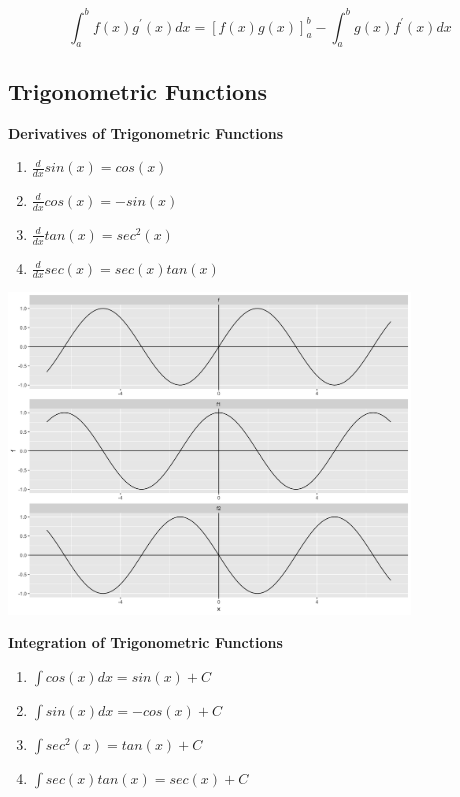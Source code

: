 \documentclass[]{book}
\providecommand{\tightlist}{%
  \setlength{\itemsep}{0pt}\setlength{\parskip}{0pt}}
\begin{document}
\newpage

\[\int_a^b f(x) g^\prime(x)dx=\left [ f(x)g(x) \right ]_a^b-\int_a^b  g(x)f^\prime(x)dx\]

\hypertarget{trigonometric-functions}{%
\subsection{Trigonometric Functions}\label{trigonometric-functions}}

\textbf{Derivatives of Trigonometric Functions}

\begin{enumerate}
\def\labelenumi{\arabic{enumi}.}
\tightlist
\item
  \(\frac{d}{dx} sin(x) = cos(x)\)
\item
  \(\frac{d}{dx} cos(x) = -sin(x)\)
\item
  \(\frac{d}{dx} tan(x) = sec^2(x)\)
\item
  \(\frac{d}{dx} sec(x) = sec(x)tan(x)\)
\end{enumerate}

\begin{center}\includegraphics[width=0.8\textwidth]{figure/unnamed-chunk-15-1} \end{center}

\textbf{Integration of Trigonometric Functions}

\begin{enumerate}
\def\labelenumi{\arabic{enumi}.}
\tightlist
\item
  \(\int cos(x)dx = sin(x) +C\)
\item
  \(\int sin(x)dx = -cos(x) +C\)
\item
  \(\int sec^2(x) = tan(x) +C\)
\item
  \(\int sec(x)tan(x) = sec(x) +C\)
\end{enumerate}
\end{document}
